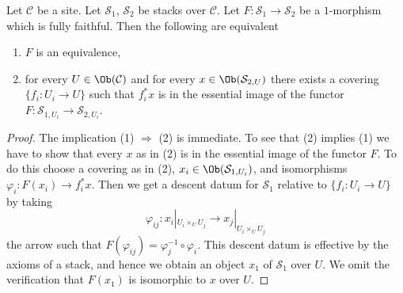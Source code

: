 \begin{lemma}
\label{lemma-characterize-essentially-surjective-when-ff}
Let $\mathcal{C}$ be a site.
Let $\mathcal{S}_1$, $\mathcal{S}_2$ be stacks over $\mathcal{C}$.
Let $F : \mathcal{S}_1 \to \mathcal{S}_2$ be a $1$-morphism which is
fully faithful. Then the following are equivalent
\begin{enumerate}
\item $F$ is an equivalence,
\item for every $U \in \Ob(\mathcal{C})$ and for every
$x \in \Ob(\mathcal{S}_{2, U})$ there exists a covering
$\{f_i : U_i \to U\}$ such that $f_i^*x$ is in the essential image
of the functor $F : \mathcal{S}_{1, U_i} \to \mathcal{S}_{2, U_i}$.
\end{enumerate}
\end{lemma}

\begin{proof}
The implication (1) $\Rightarrow$ (2) is immediate.
To see that (2) implies (1) we have to show that every
$x$ as in (2) is in the essential image of the functor $F$.
To do this choose a covering as in (2),
$x_i \in \Ob(\mathcal{S}_{1, U_i})$, and
isomorphisms $\varphi_i : F(x_i) \to f_i^*x$. Then we get a descent
datum for $\mathcal{S}_1$ relative to $\{f_i : U_i \to U\}$
by taking
$$
\varphi_{ij} :
x_i|_{U_i \times_U U_j}
\longrightarrow
x_j|_{U_i \times_U U_j}
$$
the arrow such that $F(\varphi_{ij}) = \varphi_j^{-1} \circ \varphi_i$.
This descent datum is effective by the axioms of a stack, and hence
we obtain an object $x_1$ of $\mathcal{S}_1$ over $U$. We omit the
verification that $F(x_1)$ is isomorphic to $x$ over $U$.
\end{proof}

